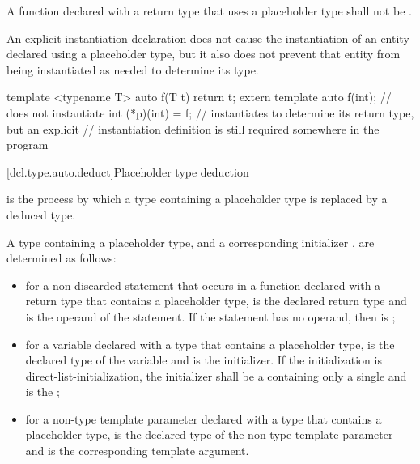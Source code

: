 \pnum
A function declared with a return type that uses a placeholder type shall not
be .

\pnum
An explicit instantiation declaration does not cause the
instantiation of an entity declared using a placeholder type, but it also does
not prevent that entity from being instantiated as needed to determine its
type.
\begin{example}
\begin{codeblock}
template <typename T> auto f(T t) { return t; }
extern template auto f(int);    // does not instantiate 
int (*p)(int) = f;              // instantiates  to determine its return type, but an explicit
                                // instantiation definition is still required somewhere in the program
\end{codeblock}
\end{example}

[dcl.type.auto.deduct]{Placeholder type deduction}
%

\pnum
{}
is the process by which
a type containing a placeholder type
is replaced by a deduced type.

\pnum
A type  containing a placeholder type,
and a corresponding initializer ,
are determined as follows:

\begin{itemize}
\item
for a non-discarded  statement that occurs
in a function declared with a return type
that contains a placeholder type,
 is the declared return type
and  is the operand of the  statement.
If the  statement
has no operand,
then  is ;
\item
for a variable declared with a type
that contains a placeholder type,
 is the declared type of the variable
and  is the initializer.
If the initialization is direct-list-initialization,
the initializer shall be a 
containing only a single 
and  is the ;
\item
for a non-type template parameter declared with a type
that contains a placeholder type,
 is the declared type of the non-type template parameter
and  is the corresponding template argument.
\end{itemize}

